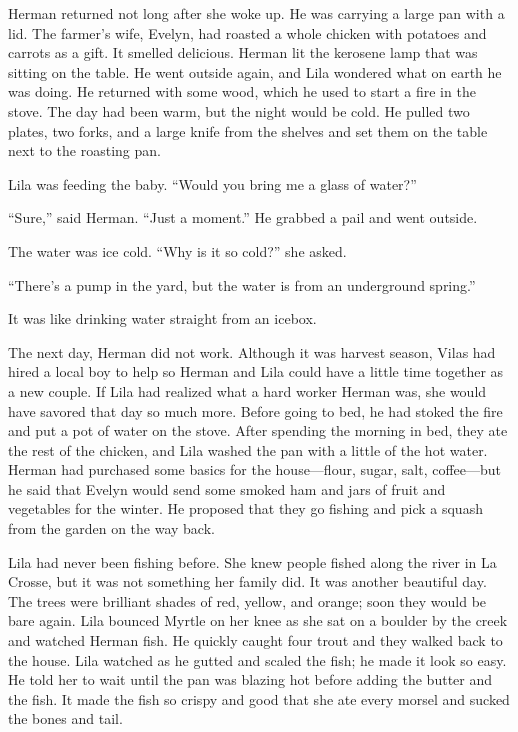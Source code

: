 \documentclass[
  letterpaper,
]{book}
\begin{document}
Herman returned not long after she woke up. He was carrying a large pan
with a lid. The farmer's wife, Evelyn, had roasted a whole chicken with
potatoes and carrots as a gift. It smelled delicious. Herman lit the
kerosene lamp that was sitting on the table. He went outside again, and
Lila wondered what on earth he was doing. He returned with some wood,
which he used to start a fire in the stove. The day had been warm, but
the night would be cold. He pulled two plates, two forks, and a large
knife from the shelves and set them on the table next to the roasting
pan.

Lila was feeding the baby. ``Would you bring me a glass of water?''

``Sure,'' said Herman. ``Just a moment.'' He grabbed a pail and went
outside.

The water was ice cold. ``Why is it so cold?'' she asked.

``There's a pump in the yard, but the water is from an underground
spring.''

It was like drinking water straight from an icebox.

The next day, Herman did not work. Although it was harvest season, Vilas
had hired a local boy to help so Herman and Lila could have a little
time together as a new couple. If Lila had realized what a hard worker
Herman was, she would have savored that day so much more. Before going
to bed, he had stoked the fire and put a pot of water on the stove.
After spending the morning in bed, they ate the rest of the chicken, and
Lila washed the pan with a little of the hot water. Herman had purchased
some basics for the house---flour, sugar, salt, coffee---but he said
that Evelyn would send some smoked ham and jars of fruit and vegetables
for the winter. He proposed that they go fishing and pick a squash from
the garden on the way back.

Lila had never been fishing before. She knew people fished along the
river in La Crosse, but it was not something her family did. It was
another beautiful day. The trees were brilliant shades of red, yellow,
and orange; soon they would be bare again. Lila bounced Myrtle on her
knee as she sat on a boulder by the creek and watched Herman fish. He
quickly caught four trout and they walked back to the house. Lila
watched as he gutted and scaled the fish; he made it look so easy. He
told her to wait until the pan was blazing hot before adding the butter
and the fish. It made the fish so crispy and good that she ate every
morsel and sucked the bones and tail.
\end{document}
